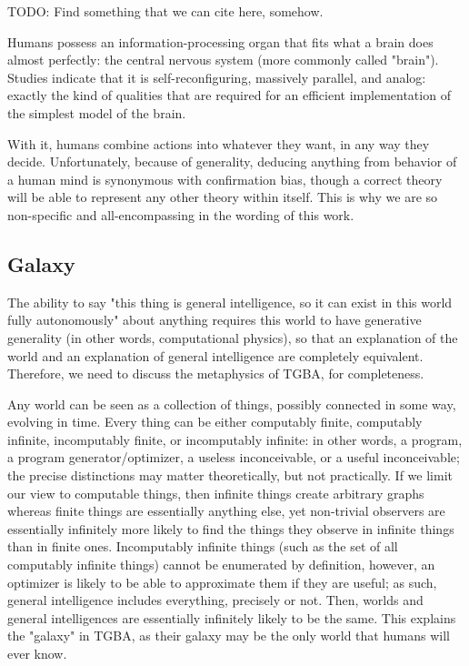 \documentclass{article}
\begin{document}
    TODO: Find something that we can cite here, somehow.

Humans possess an information-processing organ that fits what a brain does almost perfectly: the central nervous system (more commonly called "brain"). Studies indicate that it is self-reconfiguring, massively parallel, and analog: exactly the kind of qualities that are required for an efficient implementation of the simplest model of the brain.

With it, humans combine actions into whatever they want, in any way they decide. Unfortunately, because of generality, deducing anything from behavior of a human mind is synonymous with confirmation bias, though a correct theory will be able to represent any other theory within itself. This is why we are so non-specific and all-encompassing in the wording of this work.

\subsection{Galaxy}

The ability to say "this thing is general intelligence, so it can exist in this world fully autonomously" about anything requires this world to have generative generality (in other words, computational physics), so that an explanation of the world and an explanation of general intelligence are completely equivalent. Therefore, we need to discuss the metaphysics of TGBA, for completeness.

Any world can be seen as a collection of things, possibly connected in some way, evolving in time. Every thing can be either computably finite, computably infinite, incomputably finite, or incomputably infinite: in other words, a program, a program generator/optimizer, a useless inconceivable, or a useful inconceivable; the precise distinctions may matter theoretically, but not practically. If we limit our view to computable things, then infinite things create arbitrary graphs whereas finite things are essentially anything else, yet non-trivial observers are essentially infinitely more likely to find the things they observe in infinite things than in finite ones. Incomputably infinite things (such as the set of all computably infinite things) cannot be enumerated by definition, however, an optimizer is likely to be able to approximate them if they are useful; as such, general intelligence includes everything, precisely or not. Then, worlds and general intelligences are essentially infinitely likely to be the same. This explains the "galaxy" in TGBA, as their galaxy may be the only world that humans will ever know.
\end{document}
